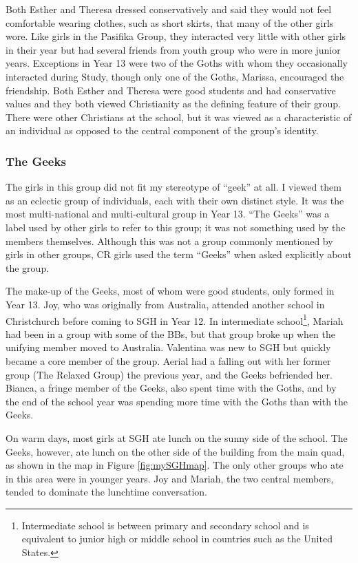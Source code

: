 Both Esther and Theresa dressed conservatively and said they would not feel comfortable wearing clothes, such as short skirts, that many of the other girls wore.  Like girls in the Pasifika Group, they interacted very little with other girls in their year but had several friends from youth group who were in more junior years.  Exceptions in Year 13 were two of the Goths with whom they occasionally interacted during Study, though only one of the Goths, Marissa, encouraged the friendship.  Both Esther and Theresa were good students and had conservative values and they both viewed Christianity as the defining feature of their group.  There were other Christians at the school, but it was viewed as a characteristic of an individual as opposed to the central component of the group's identity.
 
\subsubsection{The Geeks}\label{geeks}

The girls in this group did not fit my stereotype of ``geek'' at all.  I viewed them as an eclectic group of individuals, each with their own distinct style.  It was the most multi-national and multi-cultural group in Year 13. ``The Geeks'' was a label used by other girls to refer to this group; it was not something used by the members themselves.  Although this was not a group commonly mentioned by girls in other groups, CR girls used the term ``Geeks'' when asked explicitly about the group.  

The make-up of the Geeks, most of whom were good students, only formed in Year 13.  Joy, who was originally from Australia, attended another school in Christchurch before coming to SGH in Year 12.  In intermediate school\footnote{Intermediate school is between primary and secondary school and is equivalent to junior high or middle school in countries such as the United States.}, Mariah had been in a group with some of the BBs, but that group broke up when the unifying member moved to Australia.  Valentina was new to SGH but quickly became a core member of the group. Aerial had a falling out with her former group (The Relaxed Group) the previous year, and the Geeks befriended her.  Bianca, a fringe member of the Geeks, also spent time with the Goths, and by the end of the school year was spending more time with the Goths than with the Geeks.  

On warm days, most girls at SGH ate lunch on the sunny side of the school.  The Geeks, however, ate lunch on the other side of the building from the main quad, as shown in the map in Figure \ref{fig:mySGHmap}.  The only other groups who ate in this area were in younger years.  Joy and Mariah, the two central members, tended to dominate the lunchtime conversation.  

